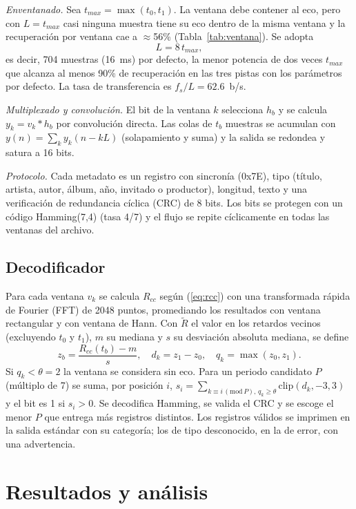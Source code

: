 \documentclass[journal]{IEEEtran}
\begin{document}
\textit{Enventanado.} Sea $t_{max}=\max(t_0,t_1)$. La ventana debe contener al eco, pero con $L=t_{max}$ casi ninguna muestra tiene su eco dentro de la misma ventana y la recuperación por ventana cae a $\approx$56\% (Tabla~\ref{tab:ventana}). Se adopta
\begin{equation}
L=8\,t_{max},
\label{eq:L}
\end{equation}
es decir, 704 muestras (16~ms) por defecto, la menor potencia de dos veces $t_{max}$ que alcanza al menos 90\% de recuperación en las tres pistas con los parámetros por defecto. La tasa de transferencia es $f_s/L=62.6$~b/s.

\textit{Multiplexado y convolución.} El bit de la ventana $k$ selecciona $h_b$ y se calcula $y_k=v_k*h_b$ por convolución directa. Las colas de $t_b$ muestras se acumulan con $y(n)=\sum_k y_k(n-kL)$ (solapamiento y suma) y la salida se redondea y satura a 16 bits.

\textit{Protocolo.} Cada metadato es un registro con sincronía (0x7E), tipo (título, artista, autor, álbum, año, invitado o productor), longitud, texto y una verificación de redundancia cíclica (CRC) de 8 bits. Los bits se protegen con un código Hamming(7,4) (tasa 4/7) y el flujo se repite cíclicamente en todas las ventanas del archivo.

\subsection{Decodificador}
Para cada ventana $v_k$ se calcula $R_{cc}$ según (\ref{eq:rcc}) con una transformada rápida de Fourier (FFT) de 2048 puntos, promediando los resultados con ventana rectangular y con ventana de Hann. Con $\tilde R$ el valor en los retardos vecinos (excluyendo $t_0$ y $t_1$), $m$ su mediana y $s$ su desviación absoluta mediana, se define
\begin{equation}
z_b=\frac{R_{cc}(t_b)-m}{s},\quad d_k=z_1-z_0,\quad q_k=\max(z_0,z_1).
\label{eq:z}
\end{equation}
Si $q_k<\theta=2$ la ventana se considera sin eco. Para un periodo candidato $P$ (múltiplo de 7) se suma, por posición $i$, $s_i=\sum_{k\equiv i\,(\mathrm{mod}\,P),\,q_k\ge\theta}\mathrm{clip}(d_k,-3,3)$ y el bit es 1 si $s_i>0$. Se decodifica Hamming, se valida el CRC y se escoge el menor $P$ que entrega más registros distintos. Los registros válidos se imprimen en la salida estándar con su categoría; los de tipo desconocido, en la de error, con una advertencia.

\section{Resultados y análisis}
\end{document}
